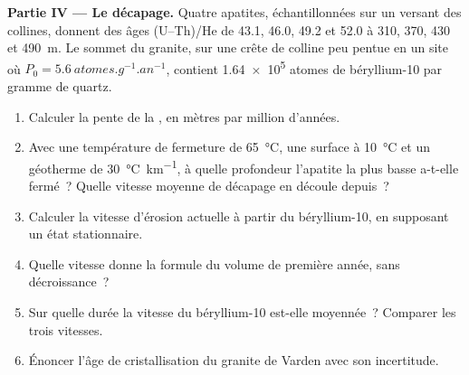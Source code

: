 \begin{problem}
\medskip\noindent\textbf{Partie IV --- Le décapage.} Quatre apatites, échantillonnées
sur un versant des collines, donnent des âges (U--Th)/He de 43.1, 46.0, 49.2 et
\qty{52.0}{\Ma} à 310, 370, 430 et \qty{490}{m}. Le sommet du granite,
sur une crête de colline peu pentue en un site où $P_0 = \qty{5.6}{atomes.g^{-1}.an^{-1}}$,
contient \num{1.64e5} atomes de béryllium-10 par gramme de quartz.
\begin{enumerate}[resume]
\item Calculer la pente de la , en mètres par
million d'années.
\item Avec une température de fermeture de \qty{65}{\celsius}, une surface à
\qty{10}{\celsius} et un géotherme de \qty{30}{\celsius.km^{-1}}, à quelle profondeur
l'apatite la plus basse a-t-elle fermé~? Quelle vitesse moyenne de décapage en découle depuis~?
\item Calculer la vitesse d'érosion actuelle à partir du béryllium-10, en supposant un
état stationnaire.
\item Quelle vitesse donne la formule du volume de première année, sans décroissance~?
\item Sur quelle durée la vitesse du béryllium-10 est-elle moyennée~? Comparer les trois
vitesses.
\item Énoncer l'âge de cristallisation du granite de Varden avec son
incertitude.
\end{enumerate}
\end{problem}
